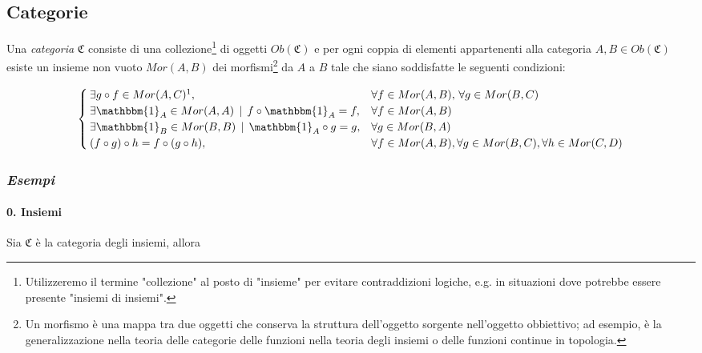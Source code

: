 \subsection{Categorie}

Una \textit{categoria} $ \mathfrak{C} $ consiste di una collezione\footnote{%
	Utilizzeremo il termine "collezione" al posto di "insieme" per evitare contraddizioni logiche, e.g. in situazioni dove potrebbe essere presente "insiemi di insiemi".%
} di oggetti $ Ob(\mathfrak{C}) $ e per ogni coppia di elementi appartenenti alla categoria $ A,B \in Ob(\mathfrak{C}) $ esiste un insieme non vuoto $ Mor(A,B) $ dei morfismi\footnote{%
	Un morfismo è una mappa tra due oggetti che conserva la struttura dell'oggetto sorgente nell'oggetto obbiettivo; ad esempio, è la generalizzazione nella teoria delle categorie delle funzioni nella teoria degli insiemi o delle funzioni continue in topologia.%
} da $ A $ a $ B $ tale che siano soddisfatte le seguenti condizioni:

\begin{equation}
	\begin{cases}
		\exists g \circ f \in Mor(A,C)\footnotemark, & \forall f \in Mor(A,B), \, \forall g \in Mor(B,C)\\
		\exists \mathbbm{1}_{A} \in Mor(A,A) \, \mid \, f \circ \mathbbm{1}_{A} = f, & \forall f \in Mor(A,B)\\
		\exists \mathbbm{1}_{B} \in Mor(B,B) \, \mid \, \mathbbm{1}_{A} \circ g = g, & \forall g \in Mor(B,A)\\
		(f \circ g) \circ h = f \circ (g \circ h), & \forall f \in Mor(A,B), \forall g \in Mor(B,C), \forall h \in Mor(C,D)
	\end{cases}
\footnotetext{Il simbolo $ \circ $ indica la composizione ma, nella teoria delle categorie, non è necessariamente la composizione come si intende per le funzioni in teoria degli insiemi; nonostante ciò, vedremo solo esempi in cui le due composizioni sopraccitate coincidono.}
\end{equation}

\subsubsection{\textit{Esempi}}

\paragraph{0. Insiemi}

Sia $ \mathfrak{C} $ è la categoria degli insiemi, allora

